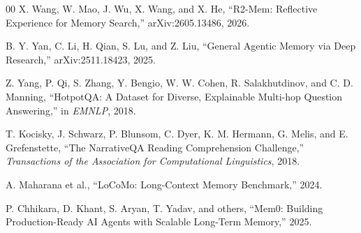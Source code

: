 \documentclass[conference]{IEEEtran}
\begin{document}
\begin{thebibliography}{00}
X. Wang, W. Mao, J. Wu, X. Wang, and X. He, ``R2-Mem: Reflective Experience
for Memory Search,'' arXiv:2605.13486, 2026.

B. Y. Yan, C. Li, H. Qian, S. Lu, and Z. Liu, ``General Agentic Memory via
Deep Research,'' arXiv:2511.18423, 2025.

Z. Yang, P. Qi, S. Zhang, Y. Bengio, W. W. Cohen, R. Salakhutdinov, and C.
D. Manning, ``HotpotQA: A Dataset for Diverse, Explainable Multi-hop Question
Answering,'' in \emph{EMNLP}, 2018.

T. Kocisky, J. Schwarz, P. Blunsom, C. Dyer, K. M. Hermann, G. Melis, and E.
Grefenstette, ``The NarrativeQA Reading Comprehension Challenge,''
\emph{Transactions of the Association for Computational Linguistics}, 2018.

A. Maharana et al., ``LoCoMo: Long-Context Memory Benchmark,'' 2024.

P. Chhikara, D. Khant, S. Aryan, T. Yadav, and others, ``Mem0: Building
Production-Ready AI Agents with Scalable Long-Term Memory,'' 2025.
\end{thebibliography}
\end{document}
